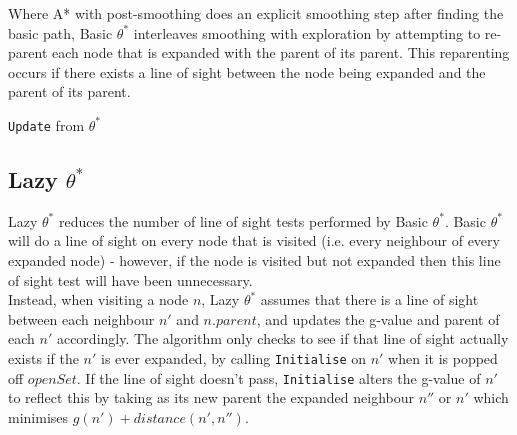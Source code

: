 \documentclass[12pt,notitlepage]{report}
\begin{document}
Where A* with post-smoothing does an explicit smoothing step after finding the basic path, Basic {$\theta^{*}$} interleaves smoothing with exploration by attempting to re-parent each node that is expanded with the parent of its parent. This reparenting occurs if there exists a line of sight between the node being expanded and the parent of its parent.\\

\begin{algorithm}[htp]
  \SetAlgoLined\DontPrintSemicolon
  \caption{{\tt Update} from {\sc $\theta^{*}$}}
\end{algorithm} 

\subsection {Lazy {$\theta^{*}$}}

Lazy {$\theta^{*}$} reduces the number of line of sight tests performed by Basic {$\theta^{*}$}. Basic {$\theta^{*}$} will do a line of sight on every node that is visited (i.e. every neighbour of every expanded node) - however, if the node is visited but not expanded then this line of sight test will have been unnecessary.\\

\noindent
Instead, when visiting a node $n$, Lazy {$\theta^{*}$} assumes that there is a line of sight between each neighbour $n'$ and $n.parent$, and updates the g-value and parent of each $n'$ accordingly. The algorithm only checks to see if that line of sight actually exists if the $n'$ is ever expanded, by calling {\tt Initialise} on $n'$ when it is popped off $openSet$. If the line of sight doesn't pass, {\tt Initialise} alters the g-value of $n'$ to reflect this by taking as its new parent the expanded neighbour $n''$ or $n'$ which minimises {$g(n') + distance(n',n'')$}.
\end{document}
